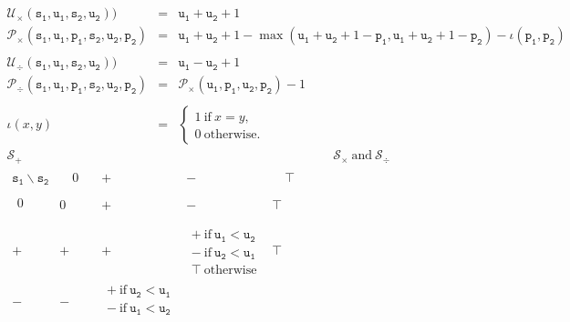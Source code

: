 \begin{figure}[tb]
$$\begin{array}{rcl}
\\
\\
\mathcal{U}_\times(\mathtt{s_1},\mathtt{u_1},\mathtt{s_2},\mathtt{u_2}))&=&\mathtt{u_1}+\mathtt{u_2}+1\\
\mathcal{P}_\times(\mathtt{s_1},\mathtt{u_1},\mathtt{p_1},\mathtt{s_2},\mathtt{u_2},\mathtt{p_2})&=&
\mathtt{u_1}+\mathtt{u_2}+1-
\max(
\mathtt{u_1}+\mathtt{u_2}+1-\mathtt{p_1},
\mathtt{u_1}+\mathtt{u_2}+1-\mathtt{p_2})-\iota(\mathtt{p_1},\mathtt{p_2})\\
\\
\mathcal{U}_\div(\mathtt{s_1},\mathtt{u_1},\mathtt{s_2},\mathtt{u_2}))&=&\mathtt{u_1}-\mathtt{u_2}+1\\
\mathcal{P}_\div(\mathtt{s_1},\mathtt{u_1},\mathtt{p_1},\mathtt{s_2},\mathtt{u_2},\mathtt{p_2})&=&\mathcal{P}_\times(\mathtt{u_1},\mathtt{p_1},\mathtt{u_2},\mathtt{p_2})-1\\
\\
\iota(x,y)&=&\left\{\begin{array}{l}
1 \ \text{if}\ x=y,\\
0\ \text{otherwise}.
\end{array}\right.
\end{array}
$$
\scriptsize
\vspace{0.2cm}
$$
\begin{array}{ccc}
\mathcal{S}_+&&\mathcal{S}_\times \ \text{and}\ \mathcal{S}_\div
\\
\begin{array}{c|c|c|c|c}
 \mathtt{s_1} \backslash \mathtt{s_2}
      &\quad 0 \quad& + & - & \quad\top\quad \\
  \hline	  
  \begin{array}{c}
  \\ 0\\ \\
  \end{array}    & 0 & + & - & \top \\
  \hline
  +    & + & + & 
  \begin{array}{c}
  + \ \text{if}\ \mathtt{u_1}<\mathtt{u_2}\\
  - \ \text{if}\ \mathtt{u_2}<\mathtt{u_1}\\
  \top\ \text{otherwise}
  \end{array}&\top\\
  \hline
  -     & - & 
  \begin{array}{c}
  + \ \text{if}\ \mathtt{u_2}<\mathtt{u_1}\\
  - \ \text{if}\ \mathtt{u_1}<\mathtt{u_2}\\

\end{array}
\end{array}
\end{array}$$
\end{figure}
